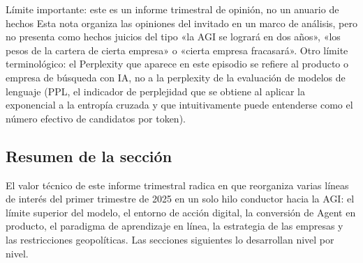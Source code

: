 \begin{warningbox}{Límite importante: este es un informe trimestral de opinión, no un anuario de hechos}
Esta nota organiza las opiniones del invitado en un marco de análisis, pero no presenta como hechos juicios del tipo «la AGI se logrará en dos años», «los pesos de la cartera de cierta empresa» o «cierta empresa fracasará». Otro límite terminológico: el Perplexity que aparece en este episodio se refiere al producto o empresa de búsqueda con IA, no a la perplexity de la evaluación de modelos de lenguaje (PPL, el indicador de perplejidad que se obtiene al aplicar la exponencial a la entropía cruzada y que intuitivamente puede entenderse como el número efectivo de candidatos por token).
\end{warningbox}

\subsection{Resumen de la sección}

El valor técnico de este informe trimestral radica en que reorganiza varias líneas de interés del primer trimestre de 2025 en un solo hilo conductor hacia la AGI: el límite superior del modelo, el entorno de acción digital, la conversión de Agent en producto, el paradigma de aprendizaje en línea, la estrategia de las empresas y las restricciones geopolíticas. Las secciones siguientes lo desarrollan nivel por nivel.
